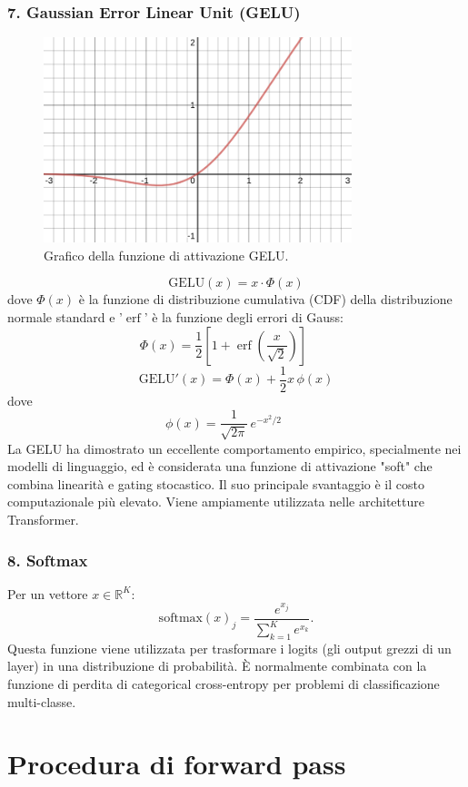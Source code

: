 \documentclass[a4paper,12pt]{report}
\begin{document}
	\subsubsection{7. Gaussian Error Linear Unit (GELU)}
	\begin{figure}[H]
		\centering
		\includegraphics[width=0.8\textwidth]{img/gelu.png}
		\caption{Grafico della funzione di attivazione GELU.}
	\end{figure}
	\[
	\mathrm{GELU}(x) = x \cdot \Phi(x)
	\]
	dove $\Phi(x)$ è la funzione di distribuzione cumulativa (CDF) della distribuzione normale standard e '$\operatorname{erf}$' è la funzione degli errori di Gauss:
	\[
	\Phi(x) = \frac{1}{2} \left[ 1 + \operatorname{erf} \left( \frac{x}{\sqrt{2}} \right) \right] \qquad
	\]
	\[
	\mathrm{GELU}'(x) = \Phi(x) + \frac{1}{2}x\,\phi(x)
	\]
	dove
	\[
	\phi(x) = \frac{1}{\sqrt{2\pi}}\,e^{-x^{2}/2} \qquad
	\]
	La GELU ha dimostrato un eccellente comportamento empirico, specialmente nei modelli di linguaggio, ed è considerata una funzione di attivazione "soft" che combina linearità e gating stocastico. Il suo principale svantaggio è il costo computazionale più elevato. Viene ampiamente utilizzata nelle architetture Transformer.
	
	\subsubsection{8. Softmax}
	Per un vettore $x\in\mathbb{R}^K$:
	\[
	\mathrm{softmax}(x)_j=\frac{e^{x_j}}{\sum_{k=1}^K e^{x_k}}.
	\]
	Questa funzione viene utilizzata per trasformare i logits (gli output grezzi di un layer) in una distribuzione di probabilità. È normalmente combinata con la funzione di perdita di categorical cross-entropy per problemi di classificazione multi-classe.
	
	\section{Procedura di forward pass}
	
\end{document}
